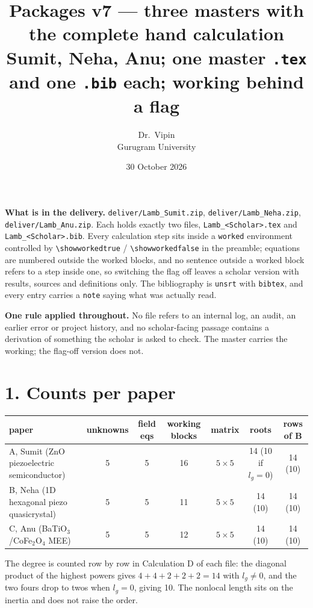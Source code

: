 \documentclass[11pt]{article}
\title{\vspace{-1.4cm}\textbf{Packages v7 --- three masters with the complete hand calculation}\\[2pt]
\large Sumit, Neha, Anu; one master \texttt{.tex} and one \texttt{.bib} each; working behind a flag}
\author{Dr.\ Vipin \\ Gurugram University}
\date{30 October 2026}
\begin{document}
\maketitle
\vspace{-6mm}
\footnotesize

\noindent\textbf{What is in the delivery.} \texttt{deliver/Lamb\_Sumit.zip},
\texttt{deliver/Lamb\_Neha.zip}, \texttt{deliver/Lamb\_Anu.zip}. Each holds exactly two files,
\texttt{Lamb\_<Scholar>.tex} and \texttt{Lamb\_<Scholar>.bib}. Every calculation step sits inside a
\texttt{worked} environment controlled by \verb|\showworkedtrue| / \verb|\showworkedfalse| in the preamble;
equations are numbered outside the worked blocks, and no sentence outside a worked block refers to a step
inside one, so switching the flag off leaves a scholar version with results, sources and definitions only.
The bibliography is \texttt{unsrt} with \texttt{bibtex}, and every entry carries a \texttt{note} saying what
was actually read.

\medskip
\noindent\textbf{One rule applied throughout.} No file refers to an internal log, an audit, an earlier
error or project history, and no scholar-facing passage contains a derivation of something the scholar is
asked to check. The master carries the working; the flag-off version does not.

\section*{1. Counts per paper}

\begin{center}
\begin{tabular}{lcccccc}
\toprule
paper & unknowns & field eqs & working blocks & matrix & roots & rows of $\mathbf B$\\
\midrule
A, Sumit (ZnO piezoelectric semiconductor) & 5 & 5 & 16 & $5\times5$ & 14 (10 if $l_g=0$) & 14 (10)\\
B, Neha (1D hexagonal piezo quasicrystal) & 5 & 5 & 11 & $5\times5$ & 14 (10) & 14 (10)\\
C, Anu (BaTiO$_3$/CoFe$_2$O$_4$ MEE) & 5 & 5 & 12 & $5\times5$ & 14 (10) & 14 (10)\\
\bottomrule
\end{tabular}
\end{center}

The degree is counted row by row in Calculation D of each file: the diagonal product of the highest powers
gives $4+4+2+2+2=14$ with $l_g\ne0$, and the two fours drop to twos when $l_g=0$, giving 10. The nonlocal
length sits on the inertia and does not raise the order.
\end{document}
